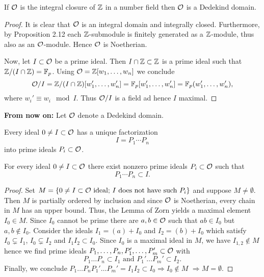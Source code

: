 \begin{Prop}
	If $\mathcal{O}$ is the integral closure of $\mathbb{Z}$ in a number field then $\mathcal{O}$ is a Dedekind domain.
\end{Prop}


\begin{proof}
	It is clear that $\mathcal{O}$ is an integral domain and integrally closed.
	Furthermore, by Proposition 2.12 each $\mathbb{Z}$-submodule is finitely generated as a $\mathbb{Z}$-module, thus also as an $\mathcal{O}$-module. Hence $\mathcal{O}$ is Noetherian.
	
	Now, let $I \subset \mathcal{O}$ be a prime ideal. Then $I \cap \mathbb{Z} \subset \mathbb{Z}$ is a prime ideal such that $\mathbb{Z}/(I\cap \mathbb{Z}) =\mathbb{F}_p$.
	Using $\mathcal{O}= \mathbb{Z}[w_1,\dots, w_n]$ we conclude
	\[ \mathcal{O}/ I = \mathbb{Z}/(I\cap \mathbb{Z}) [w_1', \dots, w_n'] 
	= \mathbb{F}_p [w_1', \dots, w_n'] 
	= \mathbb{F}_p (w_1', \dots, w_n'),
	\]
	where $w_i' \equiv w_i \mod I$. Thus $\mathcal{O}/ I$ is a field ad hence $I$ maximal.
\end{proof}

\textbf{From now on:} Let $\mathcal{O}$ denote a Dedekind domain.

\begin{Satz}
	Every ideal $0 \neq I \subset \mathcal{O}$ has a unique factorization
	\[ I = P_1 \cdots P_n
	\]
	into prime ideals $P_i \subset \mathcal{O}$.
\end{Satz}

\begin{Lem}
	For every ideal $0\neq I \subset \mathcal{O}$ there exist nonzero prime ideals $P_i \subset \mathcal{O}$ such that
	\[ P_1 \cdots P_n \subset I.
	\]
\end{Lem}

\begin{proof}Set $M = \{ 0 \neq I \subset \mathcal{O} \text{ ideal; } I \text{ does not have such } P_i \}$ and suppose $M \neq \emptyset$. Then $M$ is partially ordered by inclusion and since $\mathcal{O}$ is Noetherian, every chain in $M$ has an upper bound.
	Thus, the Lemma of Zorn yields a maximal element $I_0 \in M$. Since $I_0$ cannot be prime there are $a,b \in \mathcal{O}$ such that $ab \in I_0$ but $a,b \not \in I_0$.
	Consider the ideals $I_1 = (a) +I_0$ and $I_2 =(b) + I_0$ which satisfy $I_0 \subsetneq I_1$, $I_0 \subsetneq I_2$ and $I_1I_2 \subset I_0$.
	Since $I_0$ is a maximal ideal in $M$, we have $I_{1,2} \not \in M$ hence we find 
	prime ideals $P_1, \dots, P_n, P_1', \dots, P_m' \subset \mathcal{O}$ with
	\[ P_1 \dots P_n \subset I_1 \text{ and } P_1' \dots P_m' \subset I_2.
	\]
	Finally, we conclude $  P_1 \dots P_nP_1' \dots P_m' = I_1I_2 \subset I_0 \Rightarrow I_0 \not \in M$ \Lightning $\Rightarrow M = \emptyset$.
\end{proof}

